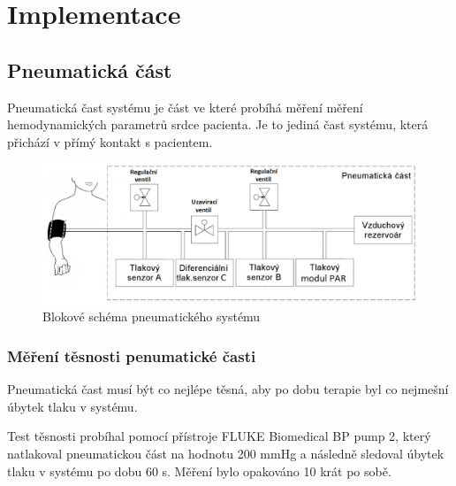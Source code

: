 \chapter{Implementace}


\section{Pneumatická část}

Pneumatická čast systému je část ve které probíhá měření měření hemodynamických parametrů srdce pacienta. Je to jediná čast systému, která přichází v přímý kontakt s pacientem.
\begin{figure}[H]
    \includegraphics[width=1\linewidth]{pictures/blokove_schema_pneu.jpg}
    \caption{Blokové schéma pneumatického systému}
    \label{fig:pneu_block}
\end{figure}

\subsection{Měření těsnosti penumatické časti}
Pneumatická čast musí být co nejlépe těsná, aby po dobu terapie byl co nejmešní úbytek tlaku v systému.
\par
Test těsnosti probíhal pomocí přístroje FLUKE Biomedical BP pump 2, který natlakoval pneumatickou část na hodnotu 200 mmHg a následně sledoval úbytek tlaku v systému po dobu 60 s.
Měření bylo opakováno 10 krát po sobě.

